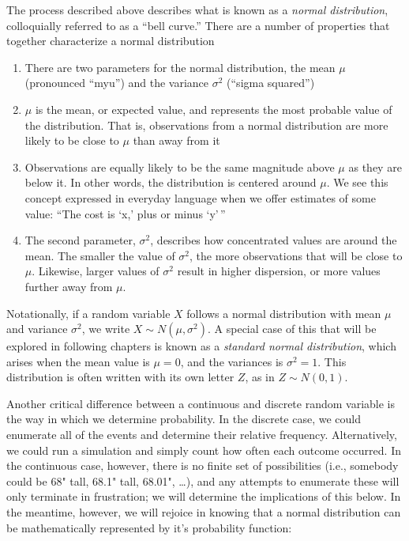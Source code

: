 \documentclass[
]{book}
\providecommand{\tightlist}{%
  \setlength{\itemsep}{0pt}\setlength{\parskip}{0pt}}
\theoremstyle{definition}
\theoremstyle{definition}
\theoremstyle{definition}
\theoremstyle{remark}
\begin{document}
The process described above describes what is known as a \emph{normal distribution}, colloquially referred to as a ``bell curve.'' There are a number of properties that together characterize a normal distribution

\begin{enumerate}
\def\labelenumi{\arabic{enumi}.}
\tightlist
\item
  There are two parameters for the normal distribution, the mean \(\mu\) (pronounced ``myu'') and the variance \(\sigma^2\) (``sigma squared'')
\item
  \(\mu\) is the mean, or expected value, and represents the most probable value of the distribution. That is, observations from a normal distribution are more likely to be close to \(\mu\) than away from it
\item
  Observations are equally likely to be the same magnitude above \(\mu\) as they are below it. In other words, the distribution is centered around \(\mu\). We see this concept expressed in everyday language when we offer estimates of some value: ``The cost is `x,' plus or minus `y'\,''
\item
  The second parameter, \(\sigma^2\), describes how concentrated values are around the mean. The smaller the value of \(\sigma^2\), the more observations that will be close to \(\mu\). Likewise, larger values of \(\sigma^2\) result in higher dispersion, or more values further away from \(\mu\).
\end{enumerate}

Notationally, if a random variable \(X\) follows a normal distribution with mean \(\mu\) and variance \(\sigma^2\), we write \(X \sim N(\mu, \sigma^2)\). A special case of this that will be explored in following chapters is known as a \emph{standard normal distribution}, which arises when the mean value is \(\mu = 0\), and the variances is \(\sigma^2 = 1\). This distribution is often written with its own letter \(Z\), as in \(Z \sim N(0, 1)\).

Another critical difference between a continuous and discrete random variable is the way in which we determine probability. In the discrete case, we could enumerate all of the events and determine their relative frequency. Alternatively, we could run a simulation and simply count how often each outcome occurred. In the continuous case, however, there is no finite set of possibilities (i.e., somebody could be 68" tall, 68.1" tall, 68.01", \ldots), and any attempts to enumerate these will only terminate in frustration; we will determine the implications of this below. In the meantime, however, we will rejoice in knowing that a normal distribution can be mathematically represented by it's probability function:
\end{document}
